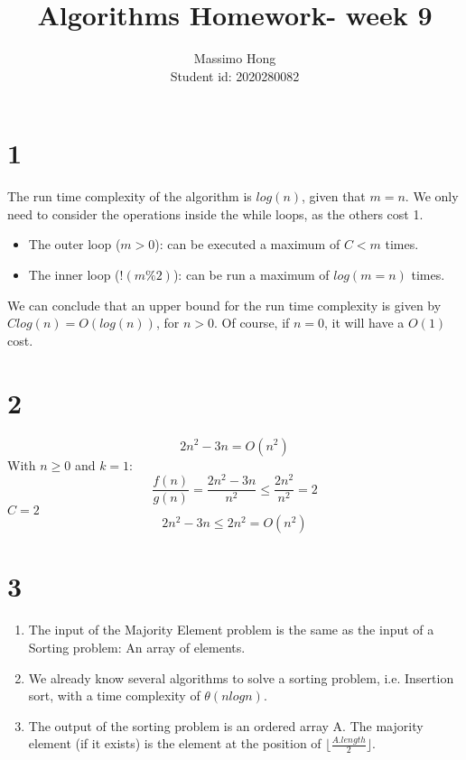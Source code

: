 \documentclass{article}
\title{Algorithms Homework- week 9}
\author{
	Massimo Hong\\
	Student id: 2020280082\\
 }
\begin{document}
\maketitle
\section*{1}
The run time complexity of the algorithm is $log(n)$, given that $m = n$.
We only need to consider the operations inside the while loops, as the others cost 1.
\begin{itemize}
	\item The outer loop ($m > 0$): can be executed a maximum of $C < m$ times.
	\item The inner loop ($!(m\%2)$): can be run a maximum of $log(m = n)$ times.
\end{itemize}
We can conclude that an upper bound for the run time complexity is given by $Clog(n) = O(log(n))$, for $n > 0$.
Of course, if $n= 0$, it will have a $O(1)$ cost.

\section*{2}
\begin{equation*}
	2n^2 - 3n = O(n^2)
\end{equation*}
With $n \geq 0$ and $k = 1$:
\begin{equation*}
	\frac{f(n)}{g(n)} = \frac{2n^2 - 3n}{n^2} \leq \frac{2n^2}{n^2} = 2
\end{equation*}
$C = 2$
\begin{equation*}
	2n^2 - 3n \leq 2n^2 = O(n^2)
\end{equation*}
\section*{3}
\begin{enumerate}
	\item The input of the Majority Element problem is the same as the input of a Sorting problem: An array of elements.
	\item We already know several algorithms to solve a sorting problem, i.e. Insertion sort, with a time complexity of $\theta(nlogn)$.
	\item The output of the sorting problem is an ordered array A. The majority element (if it exists) is the element at the position of $\lfloor\frac{A.length}{2}\rfloor$.
\end{enumerate}
\end{document}
